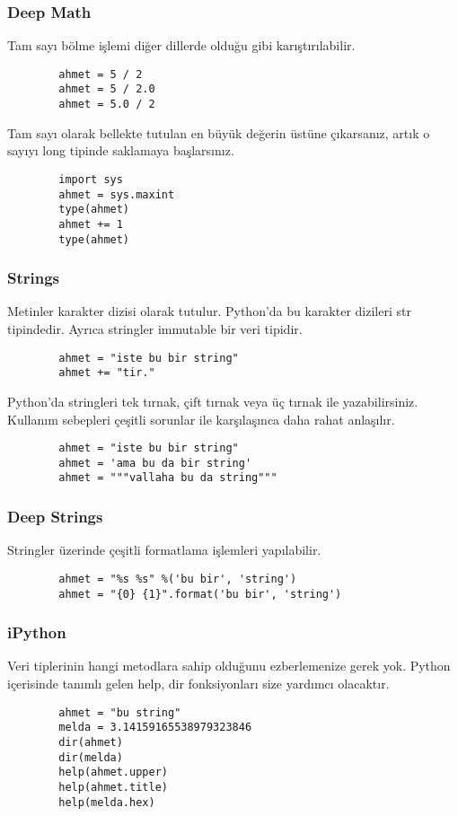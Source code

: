 \documentclass[10pt, compress]{beamer}
\begin{document}
\begin{frame}[fragile]
\frametitle{Deep Math}    
    Tam sayı bölme işlemi diğer dillerde olduğu gibi karıştırılabilir.
    \begin{verbatim}
        ahmet = 5 / 2
        ahmet = 5 / 2.0
        ahmet = 5.0 / 2
    \end{verbatim}      
    Tam sayı olarak bellekte tutulan en büyük değerin üstüne çıkarsanız, artık o sayıyı \alert{long} tipinde saklamaya başlarsınız.
    \begin{verbatim}
        import sys
        ahmet = sys.maxint
        type(ahmet)
        ahmet += 1
        type(ahmet)
    \end{verbatim}         
\end{frame} 

\begin{frame}[fragile]
\frametitle{Strings}    
    Metinler karakter dizisi olarak tutulur. Python'da bu karakter dizileri \alert{str} tipindedir. Ayrıca stringler \alert{immutable} bir veri tipidir.
    \begin{verbatim}
        ahmet = "iste bu bir string"
        ahmet += "tir."
    \end{verbatim}      
    Python'da stringleri tek tırnak, çift tırnak veya üç tırnak ile yazabilirsiniz. Kullanım sebepleri çeşitli sorunlar ile karşılaşınca daha rahat anlaşılır.
    \begin{verbatim}
        ahmet = "iste bu bir string"
        ahmet = 'ama bu da bir string'
        ahmet = """vallaha bu da string"""
    \end{verbatim}    
\end{frame} 

\begin{frame}[fragile]
\frametitle{Deep Strings}    
    Stringler üzerinde çeşitli formatlama işlemleri yapılabilir.
    \begin{verbatim}
        ahmet = "%s %s" %('bu bir', 'string')
        ahmet = "{0} {1}".format('bu bir', 'string')
    \end{verbatim}
\end{frame}

\begin{frame}[fragile]
\frametitle{iPython}    
    Veri tiplerinin hangi metodlara sahip olduğunu ezberlemenize gerek yok. Python içerisinde tanımlı gelen \alert{help, dir} fonksiyonları size yardımcı olacaktır.
    \begin{verbatim}
        ahmet = "bu string"
        melda = 3.14159165538979323846
        dir(ahmet)
        dir(melda)
        help(ahmet.upper)
        help(ahmet.title)
        help(melda.hex)
    \end{verbatim}
\end{frame}
\end{document}
